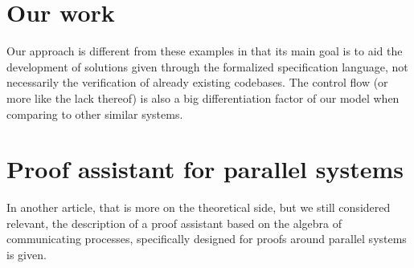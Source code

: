 \section{Our work}
Our approach is different from these examples in that its main goal is to aid the development of solutions given through the formalized specification language, not necessarily the verification of already existing codebases. The control flow (or more like the lack thereof) is also a big differentiation factor of our model when comparing to other similar systems.

\section{Proof assistant for parallel systems}
In another article\cite{Mauw1991APA}, that is more on the theoretical side, but we still considered relevant, the description of a proof assistant based on the algebra of communicating processes, specifically designed for proofs around parallel systems is given.




